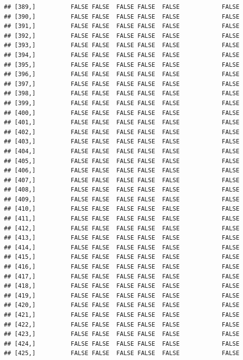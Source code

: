 \documentclass[
  english,
  man,floatsintext]{apa6}
\begin{document}
\begin{verbatim}
## [389,]          FALSE FALSE  FALSE FALSE  FALSE            FALSE
## [390,]          FALSE FALSE  FALSE FALSE  FALSE            FALSE
## [391,]          FALSE FALSE  FALSE FALSE  FALSE            FALSE
## [392,]          FALSE FALSE  FALSE FALSE  FALSE            FALSE
## [393,]          FALSE FALSE  FALSE FALSE  FALSE            FALSE
## [394,]          FALSE FALSE  FALSE FALSE  FALSE            FALSE
## [395,]          FALSE FALSE  FALSE FALSE  FALSE            FALSE
## [396,]          FALSE FALSE  FALSE FALSE  FALSE            FALSE
## [397,]          FALSE FALSE  FALSE FALSE  FALSE            FALSE
## [398,]          FALSE FALSE  FALSE FALSE  FALSE            FALSE
## [399,]          FALSE FALSE  FALSE FALSE  FALSE            FALSE
## [400,]          FALSE FALSE  FALSE FALSE  FALSE            FALSE
## [401,]          FALSE FALSE  FALSE FALSE  FALSE            FALSE
## [402,]          FALSE FALSE  FALSE FALSE  FALSE            FALSE
## [403,]          FALSE FALSE  FALSE FALSE  FALSE            FALSE
## [404,]          FALSE FALSE  FALSE FALSE  FALSE            FALSE
## [405,]          FALSE FALSE  FALSE FALSE  FALSE            FALSE
## [406,]          FALSE FALSE  FALSE FALSE  FALSE            FALSE
## [407,]          FALSE FALSE  FALSE FALSE  FALSE            FALSE
## [408,]          FALSE FALSE  FALSE FALSE  FALSE            FALSE
## [409,]          FALSE FALSE  FALSE FALSE  FALSE            FALSE
## [410,]          FALSE FALSE  FALSE FALSE  FALSE            FALSE
## [411,]          FALSE FALSE  FALSE FALSE  FALSE            FALSE
## [412,]          FALSE FALSE  FALSE FALSE  FALSE            FALSE
## [413,]          FALSE FALSE  FALSE FALSE  FALSE            FALSE
## [414,]          FALSE FALSE  FALSE FALSE  FALSE            FALSE
## [415,]          FALSE FALSE  FALSE FALSE  FALSE            FALSE
## [416,]          FALSE FALSE  FALSE FALSE  FALSE            FALSE
## [417,]          FALSE FALSE  FALSE FALSE  FALSE            FALSE
## [418,]          FALSE FALSE  FALSE FALSE  FALSE            FALSE
## [419,]          FALSE FALSE  FALSE FALSE  FALSE            FALSE
## [420,]          FALSE FALSE  FALSE FALSE  FALSE            FALSE
## [421,]          FALSE FALSE  FALSE FALSE  FALSE            FALSE
## [422,]          FALSE FALSE  FALSE FALSE  FALSE            FALSE
## [423,]          FALSE FALSE  FALSE FALSE  FALSE            FALSE
## [424,]          FALSE FALSE  FALSE FALSE  FALSE            FALSE
## [425,]          FALSE FALSE  FALSE FALSE  FALSE            FALSE
\end{verbatim}
\end{document}
